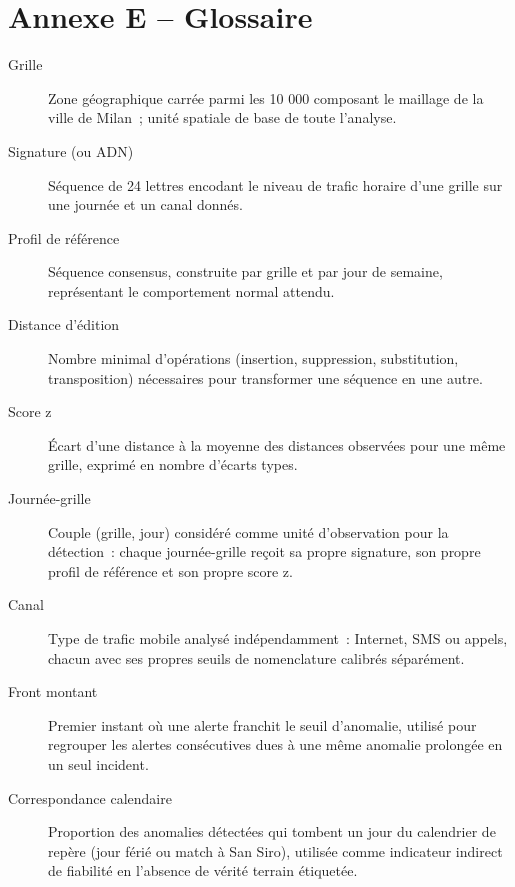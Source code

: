 \clearpage
\chapter*{Annexe E -- Glossaire}
\label{annexe:glossaire}

\begin{description}
  \item[Grille] Zone géographique carrée parmi les 10 000 composant
    le maillage de la ville de Milan~; unité spatiale de base de
    toute l'analyse.
  \item[Signature (ou ADN)] Séquence de 24 lettres encodant le niveau
    de trafic horaire d'une grille sur une journée et un canal
    donnés.
  \item[Profil de référence] Séquence consensus, construite par
    grille et par jour de semaine, représentant le comportement
    \og{}normal\fg{} attendu.
  \item[Distance d'édition] Nombre minimal d'opérations
    (insertion, suppression, substitution, transposition)
    nécessaires pour transformer une séquence en une autre.
  \item[Score z] Écart d'une distance à la moyenne des distances
    observées pour une même grille, exprimé en nombre d'écarts
    types.
  \item[Journée-grille] Couple (grille, jour) considéré comme unité
    d'observation pour la détection~: chaque journée-grille reçoit sa
    propre signature, son propre profil de référence et son propre
    score z.
  \item[Canal] Type de trafic mobile analysé indépendamment~:
    Internet, SMS ou appels, chacun avec ses propres seuils de
    nomenclature calibrés séparément.
  \item[Front montant] Premier instant où une alerte franchit le
    seuil d'anomalie, utilisé pour regrouper les alertes consécutives
    dues à une même anomalie prolongée en un seul incident.
  \item[Correspondance calendaire] Proportion des anomalies détectées
    qui tombent un jour du calendrier de repère (jour férié ou match
    à San Siro), utilisée comme indicateur indirect de fiabilité en
    l'absence de vérité terrain étiquetée.
\end{description}
